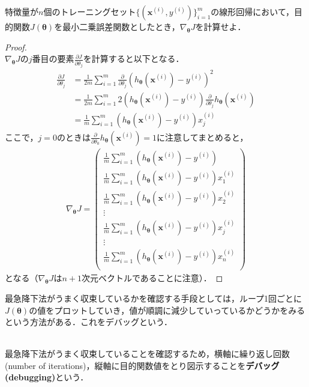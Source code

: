 \begin{qu}
特徴量が$n$個のトレーニングセット$\{({\bm x}^{(i)},y^{(i)})\}_{i=1}^m$の線形回帰において，目的関数$J({\bm \theta})$を最小二乗誤差関数としたとき，$\nabla_{{\bm \theta}}J$を計算せよ．
\end{qu}
\begin{proof}
　\\
$\nabla_{{\bm \theta}}J$の$j$番目の要素$\frac{\partial J}{\partial \theta_j}$を計算すると以下となる．
\begin{align*}
\frac{\partial J}{\partial \theta_j}&= \frac{1}{2m}\sum_{i=1}^m \frac{\partial }{\partial \theta_j}(h_{{\bm \theta}}({\bm x}^{(i)})-y^{(i)})^2 \\
&=\frac{1}{2m}\sum_{i=1}^m 2(h_{{\bm \theta}}({\bm x}^{(i)})-y^{(i)})\frac{\partial }{\partial \theta_j}h_{{\bm \theta}}({\bm x}^{(i)})\\
&= \frac{1}{m}\sum_{i=1}^m (h_{{\bm \theta}}({\bm x}^{(i)})-y^{(i)})x_j^{(i)}
\end{align*}
ここで，$j=0$のときは$\frac{\partial }{\partial \theta_0}h_{{\bm \theta}}({\bm x}^{(i)})=1$に注意してまとめると，
\begin{align*}
\nabla_{{\bm \theta}}J =
\left( 
\begin{array}{c}
\frac{1}{m}\sum_{i=1}^m (h_{{\bm \theta}}({\bm x}^{(i)})-y^{(i)}) \\
\frac{1}{m}\sum_{i=1}^m (h_{{\bm \theta}}({\bm x}^{(i)})-y^{(i)})x_1^{(i)} \\
\frac{1}{m}\sum_{i=1}^m (h_{{\bm \theta}}({\bm x}^{(i)})-y^{(i)})x_2^{(i)} \\
\vdots \\
\frac{1}{m}\sum_{i=1}^m (h_{{\bm \theta}}({\bm x}^{(i)})-y^{(i)})x_j^{(i)} \\
\vdots \\
\frac{1}{m}\sum_{i=1}^m (h_{{\bm \theta}}({\bm x}^{(i)})-y^{(i)})x_n^{(i)} \\
\end{array}
\right)
\end{align*}
となる（$\nabla_{{\bm \theta}}J$は$n+1$次元ベクトルであることに注意）．
\end{proof}

最急降下法がうまく収束しているかを確認する手段としては，ループ1回ごとに$J({\bm \theta})$の値をプロットしていき，値が順調に減少していっているかどうかをみるという方法がある．これをデバッグという．

\begin{defi}[デバッグ]
　\\
最急降下法がうまく収束していることを確認するため，横軸に繰り返し回数(number of iterations)，縦軸に目的関数値をとり図示することを{\bf デバッグ(debugging)}という．
\end{defi}

